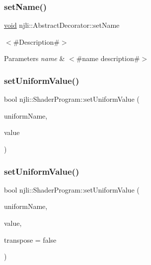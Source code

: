 \subsubsection{\texorpdfstring{set\+Name()}{setName()}}
{\footnotesize\ttfamily \mbox{\hyperlink{_thread_8h_af1e856da2e658414cb2456cb6f7ebc66}{void}} njli\+::\+Abstract\+Decorator\+::set\+Name}

$<$\#\+Description\#$>$


\begin{DoxyParams}{Parameters}
{\em name} & $<$\#name description\#$>$ \\
\hline
\end{DoxyParams}
\mbox{\label{classnjli_1_1_shader_program_aa48f0968f86931295b686cb31d6aadfd}} 
\subsubsection{\texorpdfstring{set\+Uniform\+Value()}{setUniformValue()}\hspace{0.1cm}{\footnotesize\ttfamily [1/2]}}
{\footnotesize\ttfamily bool njli\+::\+Shader\+Program\+::set\+Uniform\+Value (\begin{DoxyParamCaption}\item[{const char $\ast$}]{uniform\+Name,  }\item[{\mbox{\hyperlink{_util_8h_aa62c75d314a0d1f37f79c4b73b2292e2}{s32}}}]{value }\end{DoxyParamCaption})}

\mbox{\label{classnjli_1_1_shader_program_ab55e9cbbf6a0921259a38c50ff0c6c80}} 
\subsubsection{\texorpdfstring{set\+Uniform\+Value()}{setUniformValue()}\hspace{0.1cm}{\footnotesize\ttfamily [2/2]}}
{\footnotesize\ttfamily bool njli\+::\+Shader\+Program\+::set\+Uniform\+Value (\begin{DoxyParamCaption}\item[{const char $\ast$}]{uniform\+Name,  }\item[{const bt\+Transform \&}]{value,  }\item[{bool}]{transpose = {\ttfamily false} }\end{DoxyParamCaption})}

